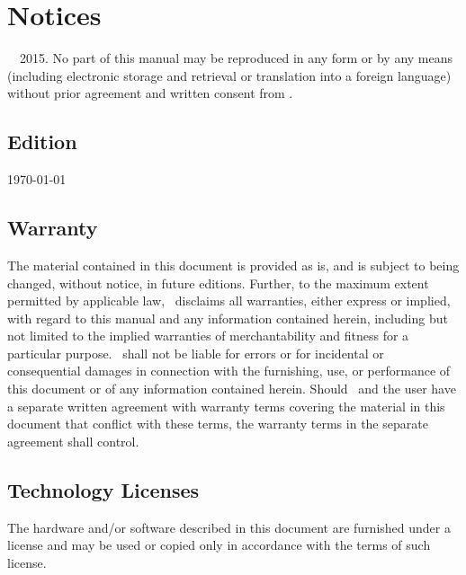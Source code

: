 
\thispagestyle{empty}
\section*{Notices}
\textcopyright~\docAuthor~2015.
No part of this manual may be reproduced in any form or by any means
(including electronic storage and retrieval or translation into a
foreign language) without prior agreement and written consent from \docAuthor.

\subsection*{Edition}
\today

\subsection*{Warranty}
The material contained in this document is provided \glqq as is\grqq, and is subject to
being changed, without notice, in future editions. Further, to the maximum extent
permitted by applicable law, \docAuthor~disclaims all warranties, either express or
implied, with regard to this manual and any information contained herein,
including but not limited to the implied warranties of merchantability and fitness
for a particular purpose. \docAuthor~shall not be liable for errors or for incidental
or consequential damages in connection with the furnishing, use, or performance of
this document or of any information contained herein. Should \docAuthor~and
the user have a separate written agreement with warranty terms covering the material
in this document that conflict with these terms, the warranty terms in the
separate agreement shall control.

\subsection*{Technology Licenses}
The hardware and/or software described in this document are furnished under a
license and may be used or copied only in accordance with the terms of such license.


